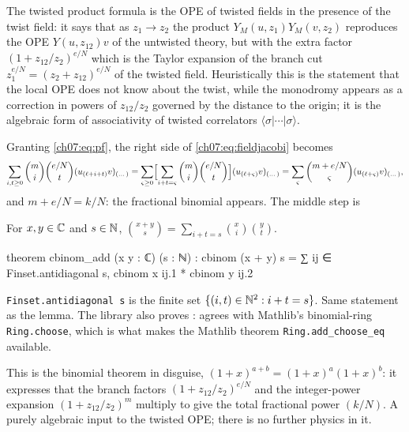\begin{physics}
The twisted product formula is the OPE of twisted fields in the presence of the twist field: it says that as $z_1\to z_2$ the product $Y_M(u,z_1)Y_M(v,z_2)$ reproduces the OPE $Y(u,z_{12})v$ of the untwisted theory, but with the extra factor $(1+z_{12}/z_2)^{e/N}$ which is the Taylor expansion of the branch cut $z_1^{e/N}=(z_2+z_{12})^{e/N}$ of the twisted field. Heuristically this is the statement that the local OPE does not know about the twist, while the monodromy appears as a correction in powers of $z_{12}/z_2$ governed by the distance to the origin; it is the algebraic form of associativity of twisted correlators $\langle\sigma|\cdots|\sigma\rangle$.
\end{physics}

\noindent Granting \eqref{ch07:eq:pf}, the right side of \eqref{ch07:eq:fieldjacobi} becomes
\begin{equation*}
  \sum_{i,t\ge0}\binom mi\binom{e/N}{t}(u_{(\ell+i+t)}v)_{(\dots)} = \sum_{\varsigma\ge0}
  \Bigl[\sum_{i+t=\varsigma}\binom mi\binom{e/N}t\Bigr](u_{(\ell+\varsigma)}v)_{(\dots)}
  = \sum_{\varsigma}\binom{m+e/N}{\varsigma}(u_{(\ell+\varsigma)}v)_{(\dots)},
\end{equation*}
and $m+e/N = k/N$: the fractional binomial appears. The middle step is

\begin{lemma}\label{ch07:lem:vandermonde}
For $x,y\in{\mathbb{C}}$ and $s\in{\mathbb{N}}$, $\binom{x+y}{s} = \sum_{i+t=s}\binom xi\binom yt$.
\end{lemma}

\begin{leancode}
theorem cbinom_add (x y : ℂ) (s : ℕ) :
    cbinom (x + y) s = ∑ ij ∈ Finset.antidiagonal s, cbinom x ij.1 * cbinom y ij.2
\end{leancode}

\begin{dictionary}
\verb|Finset.antidiagonal s| is the finite set $\{(i,t)\in{\mathbb{N}}^2: i+t=s\}$. Same statement as the
lemma. The library also proves :  agrees with Mathlib's
binomial-ring \verb|Ring.choose|, which is what makes the Mathlib theorem
\verb|Ring.add_choose_eq| available.
\end{dictionary}

\begin{physics}
This is the binomial theorem in disguise, $(1+x)^{a+b}=(1+x)^a(1+x)^b$: it expresses that the branch factors $(1+z_{12}/z_2)^{e/N}$ and the integer-power expansion $(1+z_{12}/z_2)^m$ multiply to give the total fractional power $(k/N)$. A purely algebraic input to the twisted OPE; there is no further physics in it.
\end{physics}

